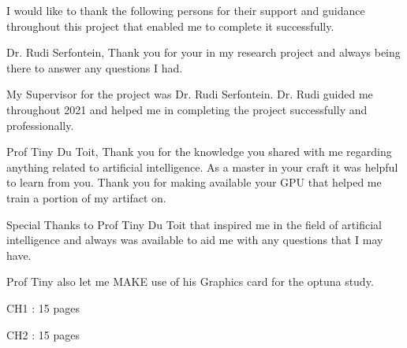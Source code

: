 \documentclass[a4paper,oneside,12pt]{book}
\begin{document}

\MakeTitle %


\begin{Acknowledgements}{}
			I would like to thank the following persons for their support and guidance throughout this project that enabled me to complete it successfully.
			
			Dr. Rudi Serfontein, Thank you for your  in my research project and always being there to answer any questions I had. 
			
			My Supervisor for the project was Dr. Rudi Serfontein. Dr. Rudi guided me throughout 2021 and helped me in completing the project successfully and professionally. 
			
			Prof   Tiny Du Toit, Thank you for the knowledge you shared with me regarding anything related to artificial intelligence. As a master in your craft it was helpful to learn from you. Thank you for making available your GPU that helped me train a portion of my artifact on.
			
			Special Thanks to Prof Tiny Du Toit that inspired me in the field of artificial intelligence and always was available to aid me with any questions that I may have.

            Prof Tiny also let me MAKE use of his Graphics card for the optuna study.
\end{Acknowledgements}


\begin{Abstract}{}
            CH1 : 15 pages
            
            CH2 : 15 pages
\end{Abstract}


\MakeTOCandLOFandLOT %
\end{document}
